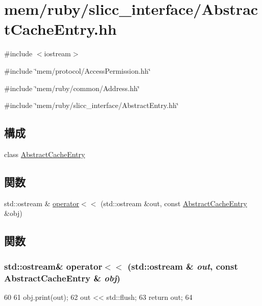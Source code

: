 \hypertarget{AbstractCacheEntry_8hh}{
\section{mem/ruby/slicc\_\-interface/AbstractCacheEntry.hh}
\label{AbstractCacheEntry_8hh}
}
{\ttfamily \#include $<$iostream$>$}\par
{\ttfamily \#include \char`\"{}mem/protocol/AccessPermission.hh\char`\"{}}\par
{\ttfamily \#include \char`\"{}mem/ruby/common/Address.hh\char`\"{}}\par
{\ttfamily \#include \char`\"{}mem/ruby/slicc\_\-interface/AbstractEntry.hh\char`\"{}}\par
\subsection*{構成}
\begin{DoxyCompactItemize}
\item 
class \hyperlink{classAbstractCacheEntry}{AbstractCacheEntry}
\end{DoxyCompactItemize}
\subsection*{関数}
\begin{DoxyCompactItemize}
\item 
std::ostream \& \hyperlink{AbstractCacheEntry_8hh_abe472e4bac45c3488d257fb8b40fa7f1}{operator$<$$<$} (std::ostream \&out, const \hyperlink{classAbstractCacheEntry}{AbstractCacheEntry} \&obj)
\end{DoxyCompactItemize}


\subsection{関数}
\hypertarget{AbstractCacheEntry_8hh_abe472e4bac45c3488d257fb8b40fa7f1}{
\subsubsection[{operator$<$$<$}]{\setlength{\rightskip}{0pt plus 5cm}std::ostream\& operator$<$$<$ (std::ostream \& {\em out}, \/  const {\bf AbstractCacheEntry} \& {\em obj})}}
\label{AbstractCacheEntry_8hh_abe472e4bac45c3488d257fb8b40fa7f1}



\begin{DoxyCode}
60 {
61     obj.print(out);
62     out << std::flush;
63     return out;
64 }
\end{DoxyCode}
